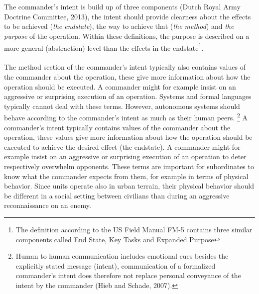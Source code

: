 \documentclass[twoside,twocolumn]{article}
\begin{document}
\\\\
The commander's intent is build up of three components (Dutch Royal Army Doctrine Committee, 2013), the intent should provide clearness about the effects to be achieved (\textit{the endstate}), the way to achieve that (\textit{the method}) and \textit{the purpose} of the operation. Within these definitions, the purpose is described on a more general (abstraction) level than the effects in the endstate\footnote{The definition according to the US Field Manual FM-5 contains three similar components called End State, Key Tasks and Expanded Purpose}.
\\\\
The method section of the commander's intent typically also contains values of the commander about the operation, these give more information about how the operation should be executed. A commander might for example insist on an aggressive or surprising execution of an operation. Systems and formal languages typically cannot deal with these terms. However, autonomous systems should behave according to the commander's intent as much as their human peers.
%
\footnote{Human to human communication includes emotional cues besides
the explicitly stated message (intent), communication of a formalized commander's intent does therefore not replace personal conveyance of the intent by the commander (Hieb and Schade, 2007).}
%
A commander's intent typically contains values of the commander about the operation, these values give more information about how the operation should be executed to achieve the desired effect (the endstate). A commander might for example insist on an aggressive or surprising execution of an operation to deter respectively overwhelm opponents. These terms are important for subordinates to know what the commander expects from them, for example in terms of physical behavior. Since units operate also in urban terrain, their physical behavior should be different in a social setting between civilians than during an aggressive reconnaissance on an enemy.
\end{document}
